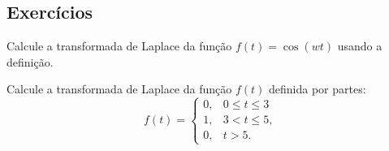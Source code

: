 \subsection*{Exercícios}
\begin{exer}Calcule a transformada de Laplace da função $f(t)=\cos(wt)$ usando a definição. 
\end{exer}
\begin{exer}Calcule a transformada de Laplace da função $f(t)$ definida por partes:
\begin{equation}
f(t)=\left\{\begin{array}{ll} 0, &0\leq t\leq 3\\ 1, & 3< t\leq 5,\\0,&t>5.
\end{array}\right.
\end{equation}
\end{exer}
